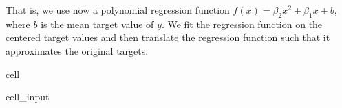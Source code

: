 \documentclass[letterpaper,10pt,english]{jupyterBook}
\begin{document}
\sphinxAtStartPar
That is, we use now a polynomial regression function \(f(x)=\beta_2x^2 + \beta_1 x + b\), where \(b\) is the mean target value of \(y\). We fit the regression function on the centered target values and then translate the regression function such that it approximates the original targets.

\begin{sphinxuseclass}{cell}\begin{sphinxVerbatimInput}

\begin{sphinxuseclass}{cell_input}
\begin{sphinxVerbatim}[commandchars=\\\{\}]
   
 
        

   



\end{sphinxVerbatim}
\end{sphinxuseclass}
\end{sphinxVerbatimInput}
\end{sphinxuseclass}
\end{document}
